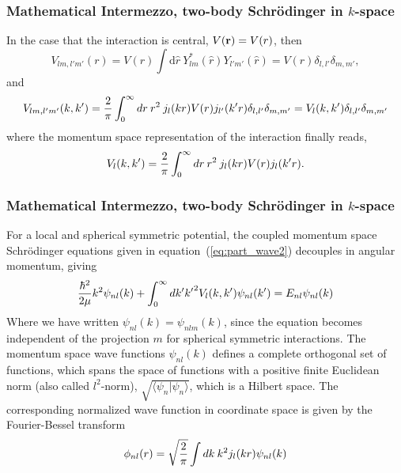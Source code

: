 \documentclass[compress]{beamer}
\begin{document}
\frame
{
\frametitle{Mathematical Intermezzo, two-body Schr\"odinger in $k$-space}
\begin{small}
{\scriptsize
In the case that the interaction is central, $V({\bf r}) = V(r)$, then
\begin{equation}
  V_{lm, l'm'}(r) = V(r) \int \mathrm{d}{\hat{r}}\:
  Y_{lm}^*(\hat{r})Y_{l'm'}(\hat{r}) = V(r) \delta_{l,l'}\delta_{m,m'},
  \label{eq:pot7}
\end{equation}
and 
\begin{equation}
  V_{lm, l'm'}(k,k') = {2 \over \pi} \int_0^\infty dr\: r^2 \:
  j_l(kr) V(r) j_{l'}(k'r)\delta_{l,l'}\delta_{m,m'} = 
  V_l(k,k') \delta_{l,l'}\delta_{m,m'}
  \label{eq:pot8}
\end{equation}
where the momentum space representation of the interaction finally reads,
\begin{equation}
  V_{l}(k,k') = {2 \over \pi} \int_0^\infty dr\: r^2 \:
  j_l(kr) V(r) j_{l}(k'r).
  \label{eq:pot9}
\end{equation}
}
\end{small}
}



\frame
{
\frametitle{Mathematical Intermezzo, two-body Schr\"odinger in $k$-space}
\begin{small}
{\scriptsize
For a local and spherical symmetric potential, 
the coupled momentum space Schr\"odinger equations given in equation~(\ref{eq:part_wave2})
decouples in angular momentum, 
giving
\begin{equation}
  {\hbar^2 \over 2\mu} k^2 \psi_{n l}(k) + 
  \int_{0}^\infty dk' {k'}^2 V_{l}(k,k') \psi_{n l }(k') =
  E_{n l} \psi_{n l}(k) 
  \label{eq:momentum_space}
\end{equation}   
Where we have written $\psi_{n l }(k) = \psi_{nlm}(k)$, since the 
equation becomes independent of the projection $m$ for spherical symmetric interactions. 
The momentum space wave functions $\psi_{n l}(k) $ defines a complete orthogonal set 
of functions, which spans the space of functions with a positive finite Euclidean norm 
 (also called $l^2$-norm), $ \sqrt{ \langle \psi_n \vert \psi_n \rangle} $, which 
is a Hilbert space. The corresponding normalized wave function in coordinate space
is given by the Fourier-Bessel transform 
\begin{equation}
  \phi_{n l}(r)  = \sqrt{ 2\over \pi}\int dk\: k^2 j_l(kr) \psi_{n l}(k)
\end{equation}    
}
\end{small}
}
\end{document}

